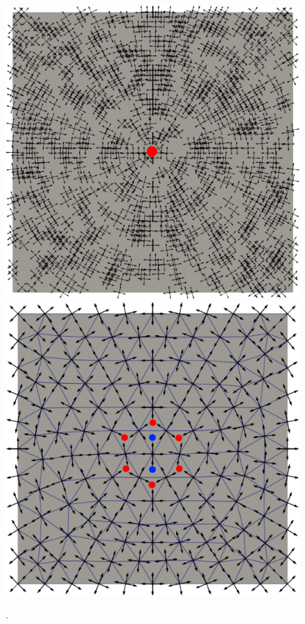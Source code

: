 \begin{figure}[!h]
  \centering
  \includegraphics[scale=0.27]{images/u_sing.pdf}\hspace{0.2cm}
  \includegraphics[scale=0.26]{images/u_h_sing.pdf}
  \caption{.}
  \label{fig:eclatement_point_sing}
\end{figure}
